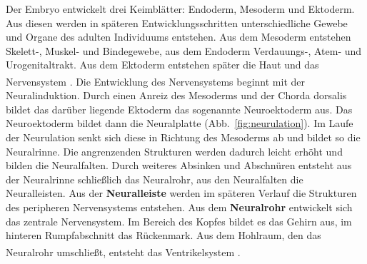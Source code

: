 \documentclass[12pt,a4paper,pdftex]{article}
\begin{document}
\begin{minipage}[b]{0.68\textwidth}
Der Embryo entwickelt drei Keimblätter: Endoderm, Mesoderm und Ektoderm. Aus diesen werden in späteren Entwicklungsschritten unterschiedliche Gewebe und Organe des adulten Individuums entstehen. Aus dem Mesoderm entstehen Skelett-, Muskel- und Bindegewebe, aus dem Endoderm Verdauungs-, Atem- und Urogenitaltrakt. Aus dem Ektoderm entstehen später die Haut und das Nervensystem \textsuperscript{\cite[1]{crossman2014neuroanatomy}}. Die Entwicklung des Nervensystems beginnt mit der Neuralinduktion. Durch einen Anreiz des Mesoderms und der Chorda dorsalis bildet das darüber liegende Ektoderm das sogenannte Neuroektoderm aus. Das Neuroektoderm bildet dann die Neuralplatte (Abb.~\ref{fig:neurulation}). Im Laufe der Neurulation senkt sich diese in Richtung des Mesoderms ab und bildet so die Neuralrinne. Die angrenzenden Strukturen werden dadurch leicht erhöht und bilden die Neuralfalten. Durch weiteres Absinken und Abschnüren entsteht aus der Neuralrinne schließlich das Neuralrohr, aus den Neuralfalten die Neuralleisten. Aus der \textbf{Neuralleiste} werden im späteren Verlauf die Strukturen des peripheren Nervensystems entstehen. Aus dem \textbf{Neuralrohr} entwickelt sich das zentrale Nervensystem. Im Bereich des Kopfes bildet es das Gehirn aus, im hinteren Rumpfabschnitt das Rückenmark. Aus dem Hohlraum, den das Neuralrohr umschließt, entsteht das Ventrikelsystem \textsuperscript{\cite[1]{trepel2011neuroanatomie}}.
\end{minipage} \hspace{0.1cm}
\end{document}
